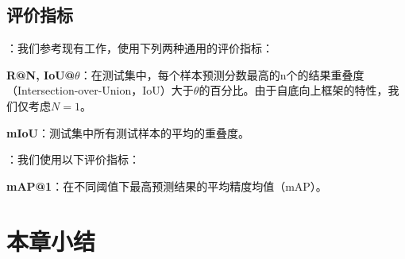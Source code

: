 \subsection{评价指标}


\noindent\textbf{}：我们参考现有工作，使用下列两种通用的评价指标：

\noindent\textbf{R@N, IoU@$\theta$}：在测试集中，每个样本预测分数最高的n个的结果重叠度（Intersection-over-Union，IoU）大于$\theta$的百分比。由于自底向上框架的特性，我们仅考虑$N=1$。

\noindent\textbf{mIoU}：测试集中所有测试样本的平均的重叠度。


\noindent\textbf{}：我们使用以下评价指标：

\noindent\textbf{mAP@1}：在不同阈值下最高预测结果的平均精度均值（mAP）。

\section{本章小结}

